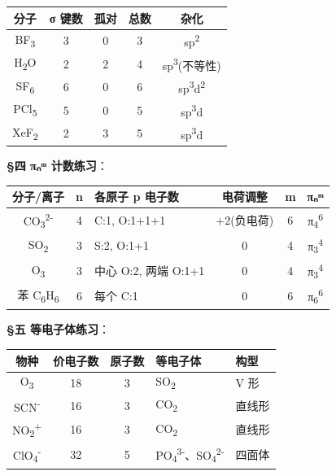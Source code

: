 {\def\LTcaptype{none} %
\begin{longtable}[]{@{}ccccc@{}}
\toprule\noalign{}
分子 & σ 键数 & 孤对 & 总数 & 杂化 \\
\midrule\noalign{}
\endhead
\bottomrule\noalign{}
\endlastfoot
BF\textsubscript{3} & 3 & 0 & 3 & sp\textsuperscript{2} \\
H\textsubscript{2}O & 2 & 2 & 4 & sp\textsuperscript{3}(不等性) \\
SF\textsubscript{6} & 6 & 0 & 6 & sp\textsuperscript{3}d\textsuperscript{2} \\
PCl\textsubscript{5} & 5 & 0 & 5 & sp\textsuperscript{3}d \\
XeF\textsubscript{2} & 2 & 3 & 5 & sp\textsuperscript{3}d \\
\end{longtable}
}

\textbf{§四 πₙᵐ 计数练习}：

{\def\LTcaptype{none} %
\begin{longtable}[]{@{}cclccc@{}}
\toprule\noalign{}
分子/离子 & n & 各原子 p 电子数 & 电荷调整 & m & πₙᵐ \\
\midrule\noalign{}
\endhead
\bottomrule\noalign{}
\endlastfoot
CO\textsubscript{3}\textsuperscript{2-} & 4 & C:1, O:1+1+1 & +2(负电荷) & 6 & π\textsubscript{4}\textsuperscript{6} \\
SO\textsubscript{2} & 3 & S:2, O:1+1 & 0 & 4 & π\textsubscript{3}\textsuperscript{4} \\
O\textsubscript{3} & 3 & 中心 O:2, 两端 O:1+1 & 0 & 4 & π\textsubscript{3}\textsuperscript{4} \\
苯 C\textsubscript{6}H\textsubscript{6} & 6 & 每个 C:1 & 0 & 6 & π\textsubscript{6}\textsuperscript{6} \\
\end{longtable}
}

\textbf{§五 等电子体练习}：

{\def\LTcaptype{none} %
\begin{longtable}[]{@{}cccll@{}}
\toprule\noalign{}
物种 & 价电子数 & 原子数 & 等电子体 & 构型 \\
\midrule\noalign{}
\endhead
\bottomrule\noalign{}
\endlastfoot
O\textsubscript{3} & 18 & 3 & SO\textsubscript{2} & V 形 \\
SCN\textsuperscript{-} & 16 & 3 & CO\textsubscript{2} & 直线形 \\
NO\textsubscript{2}\textsuperscript{+} & 16 & 3 & CO\textsubscript{2} & 直线形 \\
ClO\textsubscript{4}\textsuperscript{-} & 32 & 5 & PO\textsubscript{4}\textsuperscript{3-}、SO\textsubscript{4}\textsuperscript{2-} & 四面体 \\
\end{longtable}
}

